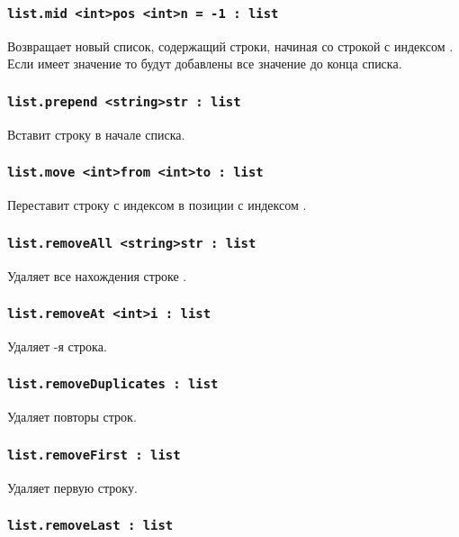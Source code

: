 \documentclass[a4paper, 14pt]{extarticle}
\begin{document}
\subsubsection{\lstinline|list.mid <int>pos <int>n = -1 : list|}

Возвращает новый список, содержащий  строки, начиная со строкой с индексом . Если  имеет значение  то будут добавлены все значение до конца списка.

\subsubsection{\lstinline|list.prepend <string>str : list|}

Вставит строку  в начале списка.

\subsubsection{\lstinline|list.move <int>from <int>to : list|}

Переставит строку с индексом  в позиции с индексом .

\subsubsection{\lstinline|list.removeAll <string>str : list|}

Удаляет все нахождения строке .

\subsubsection{\lstinline|list.removeAt <int>i : list|}

Удаляет -я строка.

\subsubsection{\lstinline|list.removeDuplicates : list|}

Удаляет повторы строк.

\subsubsection{\lstinline|list.removeFirst : list|}

Удаляет первую строку.

\subsubsection{\lstinline|list.removeLast : list|}
\end{document}
